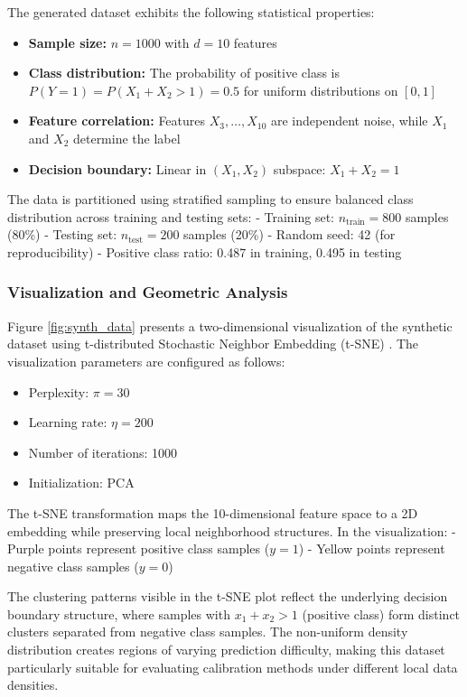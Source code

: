 \documentclass[12pt, a4paper]{article}
\begin{document}
The generated dataset exhibits the following statistical properties:

\begin{itemize}
    \item \textbf{Sample size:} $n = 1000$ with $d = 10$ features
    \item \textbf{Class distribution:} The probability of positive class is $P(Y = 1) = P(X_1 + X_2 > 1) = 0.5$ for uniform distributions on $[0,1]$
    \item \textbf{Feature correlation:} Features $X_3, \ldots, X_{10}$ are independent noise, while $X_1$ and $X_2$ determine the label
    \item \textbf{Decision boundary:} Linear in $(X_1, X_2)$ subspace: $X_1 + X_2 = 1$
\end{itemize}

The data is partitioned using stratified sampling to ensure balanced class distribution across training and testing sets:
- Training set: $n_{\text{train}} = 800$ samples (80\%)
- Testing set: $n_{\text{test}} = 200$ samples (20\%)
- Random seed: 42 (for reproducibility)
- Positive class ratio: 0.487 in training, 0.495 in testing

\subsubsection{Visualization and Geometric Analysis}

Figure \ref{fig:synth_data} presents a two-dimensional visualization of the synthetic dataset using t-distributed Stochastic Neighbor Embedding (t-SNE) \cite{maaten2008visualizing}. The visualization parameters are configured as follows:

\begin{itemize}
    \item Perplexity: $\pi = 30$
    \item Learning rate: $\eta = 200$  
    \item Number of iterations: 1000
    \item Initialization: PCA
\end{itemize}

The t-SNE transformation maps the 10-dimensional feature space to a 2D embedding while preserving local neighborhood structures. In the visualization:
- Purple points represent positive class samples ($y = 1$)
- Yellow points represent negative class samples ($y = 0$)

The clustering patterns visible in the t-SNE plot reflect the underlying decision boundary structure, where samples with $x_1 + x_2 > 1$ (positive class) form distinct clusters separated from negative class samples. The non-uniform density distribution creates regions of varying prediction difficulty, making this dataset particularly suitable for evaluating calibration methods under different local data densities.
\end{document}
